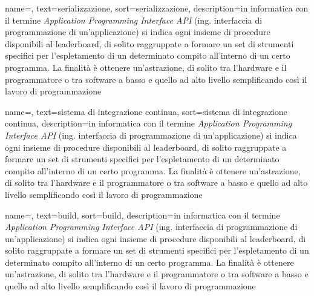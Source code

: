 {
	name=,
	text=serializzazione,
	sort=serializzazione,
	description={in informatica con il termine \emph{Application Programming Interface API} (ing. interfaccia di programmazione di un'applicazione) si indica ogni insieme di procedure disponibili al leaderboard, di solito raggruppate a formare un set di strumenti specifici per l'espletamento di un determinato compito all'interno di un certo programma. La finalità è ottenere un'astrazione, di solito tra l'hardware e il programmatore o tra software a basso e quello ad alto livello semplificando così il lavoro di programmazione}
}

{
	name=,
	text=sistema di integrazione continua,
	sort=sistema di integrazione continua,
	description={in informatica con il termine \emph{Application Programming Interface API} (ing. interfaccia di programmazione di un'applicazione) si indica ogni insieme di procedure disponibili al leaderboard, di solito raggruppate a formare un set di strumenti specifici per l'espletamento di un determinato compito all'interno di un certo programma. La finalità è ottenere un'astrazione, di solito tra l'hardware e il programmatore o tra software a basso e quello ad alto livello semplificando così il lavoro di programmazione}
}

{
	name=,
	text=build,
	sort=build,
	description={in informatica con il termine \emph{Application Programming Interface API} (ing. interfaccia di programmazione di un'applicazione) si indica ogni insieme di procedure disponibili al leaderboard, di solito raggruppate a formare un set di strumenti specifici per l'espletamento di un determinato compito all'interno di un certo programma. La finalità è ottenere un'astrazione, di solito tra l'hardware e il programmatore o tra software a basso e quello ad alto livello semplificando così il lavoro di programmazione}
}